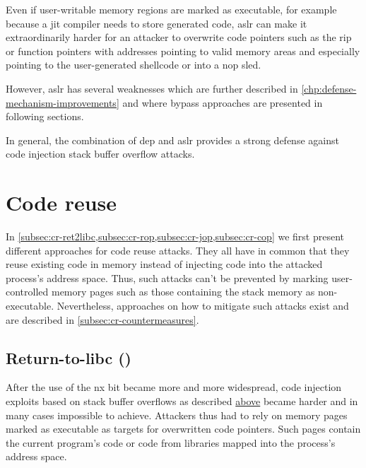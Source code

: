 Even if user-writable memory regions are marked as executable, for example because a \gls{jit} compiler needs to store generated code, \gls{aslr} can make it extraordinarily harder for an attacker to overwrite code pointers such as the \gls{rip} or function pointers with addresses pointing to valid memory areas and especially pointing to the user-generated shellcode or into a \gls{nop} sled.

However, \gls{aslr} has several weaknesses which are further described in \cref{chp:defense-mechanism-improvements} and where bypass approaches are presented in following sections.

In general, the combination of \gls{dep} and \gls{aslr} provides a strong defense against code injection stack buffer overflow attacks.

\section{Code reuse}
\label{sec:code-reuse}

In \cref{subsec:cr-ret2libc,subsec:cr-rop,subsec:cr-jop,subsec:cr-cop} we first present different approaches for code reuse attacks.
They all have in common that they reuse existing code in memory instead of injecting code into the attacked process's address space.
Thus, such attacks can't be prevented by marking user-controlled memory pages such as those containing the stack memory as non-executable.
Nevertheless, approaches on how to mitigate such attacks exist and are described in \cref{subsec:cr-countermeasures}.

\subsection{Return-to-libc ()}
\label{subsec:cr-ret2libc}

After the use of the \gls{nx} bit became more and more widespread, code injection exploits based on stack buffer overflows as described \hyperref[sec:code-injection]{above} became harder and in many cases impossible to achieve.
Attackers thus had to rely on memory pages marked as executable as targets for overwritten code pointers.
Such pages contain the current program's code or code from libraries mapped into the process's address space.

